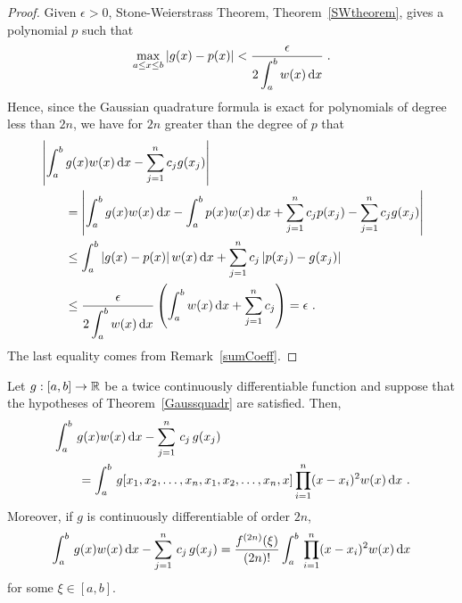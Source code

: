 \begin{proof}
Given $\epsilon > 0$, Stone-Weierstrass Theorem,
Theorem~\ref{SWtheorem}, gives a polynomial $p$ such that
\[
\max_{a\leq x \leq b} | g(x) - p(x) | <
\frac{\epsilon}{\displaystyle 2\int_a^b w(x) \,\mathrm{d}x} \; .
\]
Hence, since the Gaussian quadrature formula is exact for polynomials
of degree less than $2n$, we have for $2n$ greater than the degree of
$p$ that
\begin{align*}
&\left| \int_a^b g(x)w(x)\,\mathrm{d}x - \sum_{j=1}^n c_j g(x_j) \right| \\
&\qquad = \left| \int_a^b g(x)w(x)\,\mathrm{d}x - \int_a^b p(x)w(x)\,\mathrm{d}x
+ \sum_{j=1}^n c_j p(x_j) - \sum_{j=1}^n c_j g(x_j) \right| \\
&\qquad \leq \int_a^b \left|g(x) - p(x)\right| w(x) \,\mathrm{d}x
+ \sum_{j=1}^n c_j \left| p(x_j) - g(x_j) \right| \\
&\qquad \leq \frac{\epsilon}{\displaystyle 2 \int_a^b w(x) \,\mathrm{d}x} \left(
\int_a^b w(x) \,\mathrm{d}x + \sum_{j=1}^n c_j \right )
= \epsilon \ .
\end{align*}
The last equality comes from Remark~\ref{sumCoeff}.
\end{proof}

\begin{theorem}
Let $g:[a,b]\rightarrow \mathbb{R}$ be a twice continuously differentiable
function and suppose that the hypotheses of Theorem~\ref{Gaussquadr}
are satisfied.  Then,
\begin{align*}
&\int_a^b \,g(x) w(x)\,\mathrm{d}x - \sum_{j=1}^n \, c_j \, g(x_j) \\
&\qquad = \int_a^b\, g[x_1,x_2,\ldots,x_n,x_1,x_2,\ldots,x_n,x]
\prod_{i=1}^n (x-x_i)^2 w(x)\,\mathrm{d}x \ .
\end{align*}
Moreover, if $g$ is continuously differentiable of order $2n$,
\[
\int_a^b \,g(x) w(x)\,\mathrm{d}x - \sum_{j=1}^n \, c_j \, g(x_j) =
\frac{f^{(2n)}(\xi)}{(2n)!} \int_a^b\,\prod_{i=1}^n (x-x_i)^2 w(x) \,\mathrm{d}x
\]
for some $\xi \in [a,b]$.
\end{theorem}

